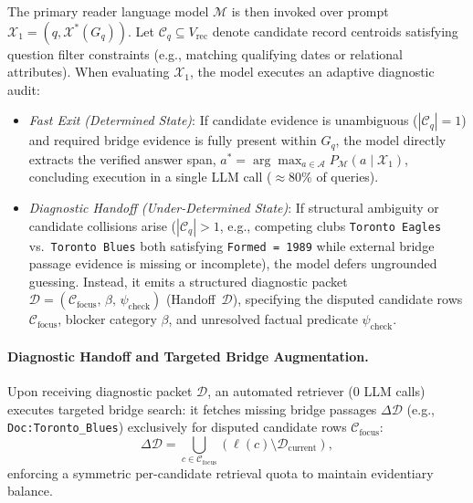 \documentclass[runningheads]{llncs}
\begin{document}
\enlargethispage{4.5\baselineskip}
The primary reader language model $\mathcal{M}$ is then invoked over prompt $\mathcal{X}_1 = (q, \mathcal{X}^*(G_q))$. Let $\mathcal{C}_q \subseteq V_{\text{rec}}$ denote candidate record centroids satisfying question filter constraints (e.g., matching qualifying dates or relational attributes). When evaluating $\mathcal{X}_1$, the model executes an adaptive diagnostic audit:
\begin{itemize}[leftmargin=1.5em]
    \item \emph{Fast Exit (Determined State)}: If candidate evidence is unambiguous ($|\mathcal{C}_q| = 1$) and required bridge evidence is fully present within $G_q$, the model directly extracts the verified answer span, $a^* = \arg\max_{a \in \mathcal{A}} P_{\mathcal{M}}(a \mid \mathcal{X}_1)$, concluding execution in a single LLM call ($\approx 80\%$ of queries).
    \item \emph{Diagnostic Handoff (Under-Determined State)}: If structural ambiguity or candidate collisions arise ($|\mathcal{C}_q| > 1$, e.g., competing clubs \texttt{Toronto Eagles} vs.\ \texttt{Toronto Blues} both satisfying \texttt{Formed = 1989} while external bridge passage evidence is missing or incomplete), the model defers ungrounded guessing. Instead, it emits a structured diagnostic packet $\mathcal{D} = (\mathcal{C}_{\text{focus}}, \, \beta, \, \psi_{\text{check}})$ (Handoff~$\mathcal{D}$), specifying the disputed candidate rows $\mathcal{C}_{\text{focus}}$, blocker category $\beta$, and unresolved factual predicate $\psi_{\text{check}}$.
\end{itemize}

\paragraph{Diagnostic Handoff and Targeted Bridge Augmentation.}
Upon receiving diagnostic packet $\mathcal{D}$, an automated retriever (0 LLM calls) executes targeted bridge search: it fetches missing bridge passages $\Delta\mathcal{D}$ (e.g., \texttt{Doc:Toronto\_Blues}) exclusively for disputed candidate rows $\mathcal{C}_{\text{focus}}$:
\begin{equation}
\label{eq:targeted-retrieval}
\Delta \mathcal{D} = \bigcup_{c \in \mathcal{C}_{\text{focus}}} \left( \ell(c) \setminus \mathcal{D}_{\text{current}} \right),
\end{equation}
enforcing a symmetric per-candidate retrieval quota to maintain evidentiary balance.
\end{document}
